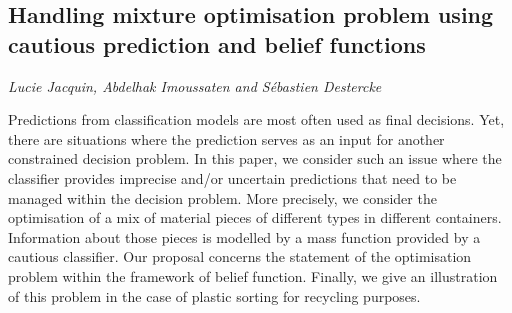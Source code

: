 \documentclass[../booklet.tex]{subfiles}
\begin{document}
\subsection[Handling mixture optimisation problem using cautious prediction and belief functions. {\it Lucie Jacquin, Abdelhak Imoussaten and Sébastien Destercke}]{Handling mixture optimisation problem using cautious prediction and belief functions}
  

\begin{center}
  {\it Lucie Jacquin, Abdelhak Imoussaten and Sébastien Destercke}
\end{center}

\vskip 0.8cm



Predictions from classification models are most often used as final decisions. Yet, there are situations where the prediction serves as an input for another constrained decision problem. In this paper, we consider such an issue where the classifier provides imprecise and/or uncertain predictions that need to be managed within the decision problem. More precisely, we consider the optimisation of a mix of material pieces of different types in different containers. Information about those pieces is modelled by a mass function provided by a cautious classifier. Our proposal concerns the statement of the optimisation problem within the framework of belief function. Finally, we give an illustration of this problem in the case of plastic sorting for recycling purposes.

\end{document}
